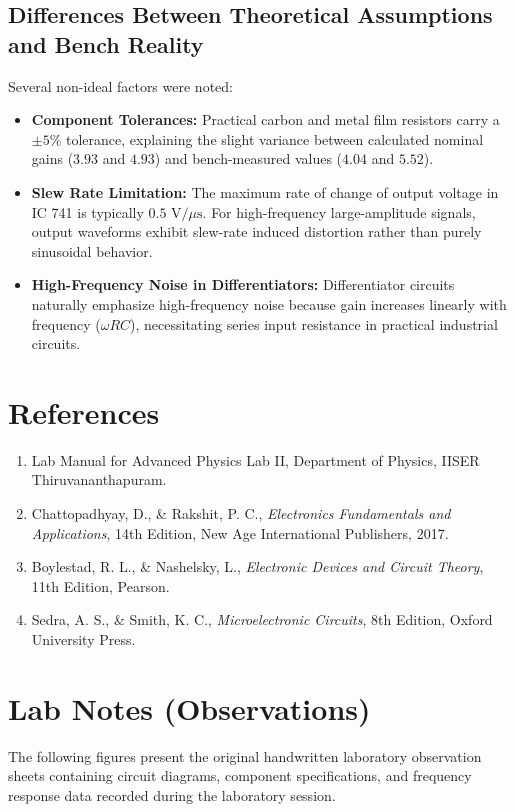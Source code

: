 \documentclass[12pt,a4paper]{article}
\begin{document}
\subsection{Differences Between Theoretical Assumptions and Bench Reality}
Several non-ideal factors were noted:
\begin{itemize}
    \item \textbf{Component Tolerances:} Practical carbon and metal film resistors carry a $\pm 5\%$ tolerance, explaining the slight variance between calculated nominal gains ($3.93$ and $4.93$) and bench-measured values ($4.04$ and $5.52$).
    \item \textbf{Slew Rate Limitation:} The maximum rate of change of output voltage in IC 741 is typically $0.5\text{ V}/\mu\text{s}$. For high-frequency large-amplitude signals, output waveforms exhibit slew-rate induced distortion rather than purely sinusoidal behavior.
    \item \textbf{High-Frequency Noise in Differentiators:} Differentiator circuits naturally emphasize high-frequency noise because gain increases linearly with frequency ($\omega RC$), necessitating series input resistance in practical industrial circuits.
\end{itemize}

\section{References}
\begin{enumerate}
    \item Lab Manual for Advanced Physics Lab II, Department of Physics, IISER Thiruvananthapuram.
    \item Chattopadhyay, D., \& Rakshit, P. C., \textit{Electronics Fundamentals and Applications}, 14th Edition, New Age International Publishers, 2017.
    \item Boylestad, R. L., \& Nashelsky, L., \textit{Electronic Devices and Circuit Theory}, 11th Edition, Pearson.
    \item Sedra, A. S., \& Smith, K. C., \textit{Microelectronic Circuits}, 8th Edition, Oxford University Press.
\end{enumerate}

\section{Lab Notes (Observations)}
The following figures present the original handwritten laboratory observation sheets containing circuit diagrams, component specifications, and frequency response data recorded during the laboratory session.
\end{document}
